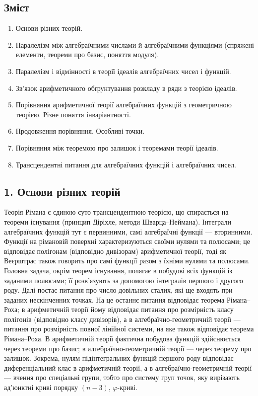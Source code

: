 \documentclass[11pt]{article}
\begin{document}
\subsection*{Зміст}
\begin{enumerate}
\item Основи різних теорій.
\item Паралелізм між алгебраїчними числами й алгебраїчними функціями (спряжені елементи, теореми про базис, поняття модуля).
\item Паралелізм і відмінності в теорії ідеалів алгебраїчних чисел і функцій.
\item Зв'язок арифметичного обґрунтування розкладу в ряди з теорією ідеалів.
\item Порівняння арифметичної теорії алгебраїчних функцій з геометричною теорією. Різне поняття інваріантності.
\item Продовження порівняння. Особливі точки.
\item Порівняння між теоремою про залишок і теоремами теорії ідеалів.
\item Трансцендентні питання для алгебраїчних функцій і алгебраїчних чисел.
\end{enumerate}

\subsection*{1. Основи різних теорій}
Теорія Рімана є єдиною суто трансцендентною теорією, що спирається на теореми існування (принцип Діріхле, методи Шварца--Неймана). Інтеграли алгебраїчних функцій тут є первинними, самі алгебраїчні функції --- вторинними. Функції на рімановій поверхні характеризуються своїми нулями та полюсами; це відповідає полігонам (відповідно дивізорам) арифметичної теорії, тоді як Веєрштрас також говорить про самі функції разом з їхніми нулями та полюсами. Головна задача, окрім теорем існування, полягає в побудові всіх функцій із заданими полюсами; її розв'язують за допомогою інтегралів першого і другого роду. Далі постає питання про число довільних сталих, які ще входять при заданих нескінченних точках. На це останнє питання відповідає теорема Рімана--Роха; в арифметичній теорії йому відповідає питання про розмірність класу полігонів (відповідно класу дивізорів), а в алгебраїчно-геометричній теорії --- питання про розмірність повної лінійної системи, на яке також відповідає теорема Рімана--Роха. В арифметичній теорії фактична побудова функцій здійснюється через теореми про базис; в алгебраїчно-геометричній теорії --- через теорему про залишок. Зокрема, нулям підінтегральних функцій першого роду відповідає диференціальний клас в арифметичній теорії, а в алгебраїчно-геометричній теорії --- вчення про спеціальні групи, тобто про систему груп точок, яку вирізають ад'юнктні криві порядку \((n-3)\), \(\varphi\)-криві.
\end{document}

